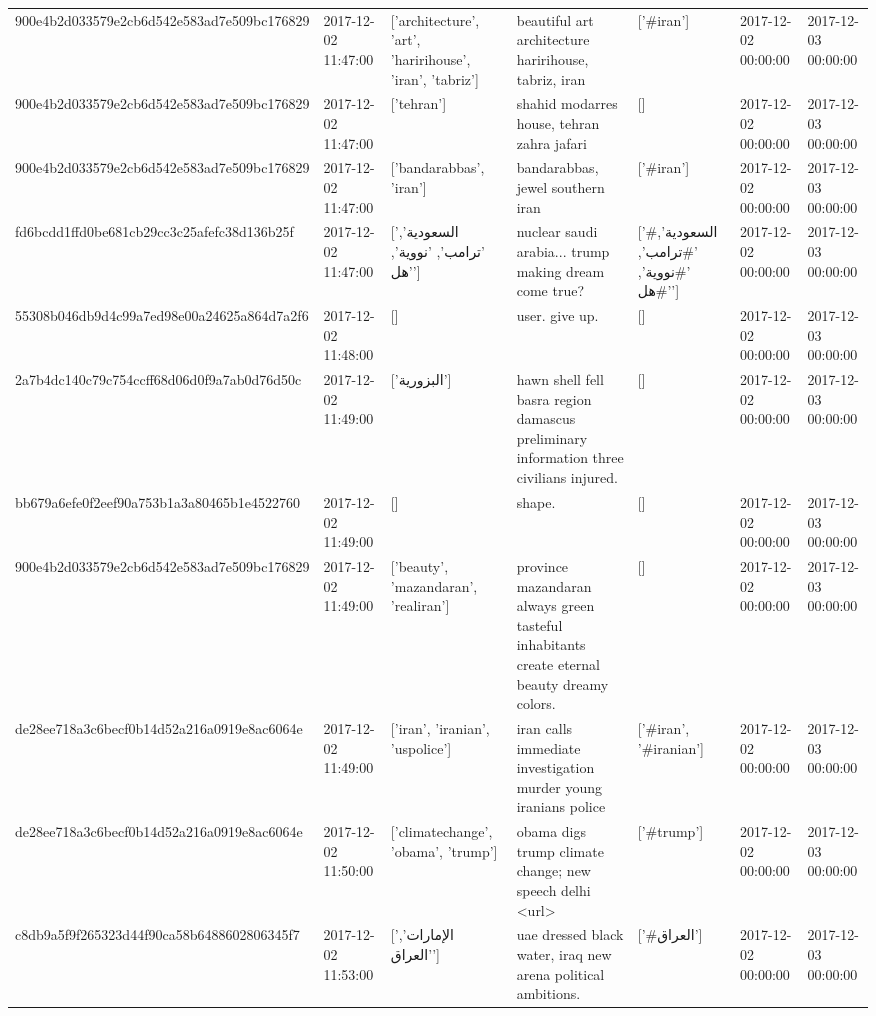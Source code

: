 \begin{tabular}{lllllll}
900e4b2d033579e2cb6d542e583ad7e509bc176829 & 2017-12-02 11:47:00 & ['architecture', 'art', 'haririhouse', 'iran', 'tabriz'] & beautiful art architecture haririhouse, tabriz, iran & ['#iran'] & 2017-12-02 00:00:00 & 2017-12-03 00:00:00 \\
900e4b2d033579e2cb6d542e583ad7e509bc176829 & 2017-12-02 11:47:00 & ['tehran'] & shahid modarres house, tehran zahra jafari & [] & 2017-12-02 00:00:00 & 2017-12-03 00:00:00 \\
900e4b2d033579e2cb6d542e583ad7e509bc176829 & 2017-12-02 11:47:00 & ['bandarabbas', 'iran'] & bandarabbas, jewel southern iran & ['#iran'] & 2017-12-02 00:00:00 & 2017-12-03 00:00:00 \\
fd6bcdd1ffd0be681cb29cc3c25afefc38d136b25f & 2017-12-02 11:47:00 & ['السعودية', 'ترامب', 'نووية', 'هل'] & nuclear saudi arabia... trump making dream come true? & ['#السعودية', '#ترامب', '#نووية', '#هل'] & 2017-12-02 00:00:00 & 2017-12-03 00:00:00 \\
55308b046db9d4c99a7ed98e00a24625a864d7a2f6 & 2017-12-02 11:48:00 & [] & user. give up. & [] & 2017-12-02 00:00:00 & 2017-12-03 00:00:00 \\
2a7b4dc140c79c754ccff68d06d0f9a7ab0d76d50c & 2017-12-02 11:49:00 & ['البزورية'] & hawn shell fell basra region damascus preliminary information three civilians injured. & [] & 2017-12-02 00:00:00 & 2017-12-03 00:00:00 \\
bb679a6efe0f2eef90a753b1a3a80465b1e4522760 & 2017-12-02 11:49:00 & [] & shape. & [] & 2017-12-02 00:00:00 & 2017-12-03 00:00:00 \\
900e4b2d033579e2cb6d542e583ad7e509bc176829 & 2017-12-02 11:49:00 & ['beauty', 'mazandaran', 'realiran'] & province mazandaran always green tasteful inhabitants create eternal beauty dreamy colors. & [] & 2017-12-02 00:00:00 & 2017-12-03 00:00:00 \\
de28ee718a3c6becf0b14d52a216a0919e8ac6064e & 2017-12-02 11:49:00 & ['iran', 'iranian', 'uspolice'] & iran calls immediate investigation murder young iranians police & ['#iran', '#iranian'] & 2017-12-02 00:00:00 & 2017-12-03 00:00:00 \\
de28ee718a3c6becf0b14d52a216a0919e8ac6064e & 2017-12-02 11:50:00 & ['climatechange', 'obama', 'trump'] & obama digs trump climate change; new speech delhi <url> & ['#trump'] & 2017-12-02 00:00:00 & 2017-12-03 00:00:00 \\
c8db9a5f9f265323d44f90ca58b6488602806345f7 & 2017-12-02 11:53:00 & ['الإمارات', 'العراق'] & uae dressed black water, iraq new arena political ambitions. & ['#العراق'] & 2017-12-02 00:00:00 & 2017-12-03 00:00:00 \\

\end{tabular}
